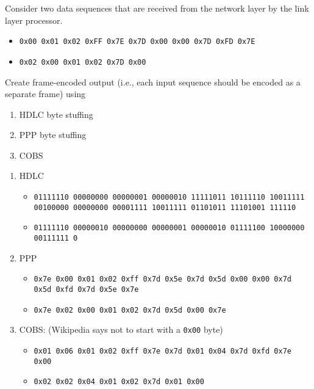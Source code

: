 \documentclass{report}
\begin{document}
\clearpage
\begin{problem}

Consider two data sequences that are received from the network layer by the link
layer processor.

\begin{itemize}
\item \texttt{0x00 0x01 0x02 0xFF 0x7E 0x7D 0x00 0x00 0x7D 0xFD 0x7E}
\item \texttt{0x02 0x00 0x01 0x02 0x7D 0x00}
\end{itemize}

Create frame-encoded output (i.e., each input sequence should be encoded as a
separate frame) using
\begin{enumerate}
\item HDLC byte stuffing
\item PPP byte stuffing
\item COBS
\end{enumerate}


\begin{answer}{45em}
  \begin{enumerate}
    \item HDLC
      \begin{itemize}
        \item \texttt{01111110 00000000 00000001 00000010 11111011 10111110 10011111 00100000 00000000 00001111 10011111 01101011 11101001 111110}
        \item \texttt{01111110 00000010 00000000 00000001 00000010 01111100 10000000 00111111 0}

      \end{itemize}

    \item PPP
      \begin{itemize}
        \item \texttt{0x7e 0x00 0x01 0x02 0xff 0x7d 0x5e 0x7d 0x5d 0x00 0x00 0x7d 0x5d 0xfd 0x7d 0x5e 0x7e}
        \item \texttt{0x7e 0x02 0x00 0x01 0x02 0x7d 0x5d 0x00 0x7e}
      \end{itemize}

    \item COBS: (Wikipedia says not to start with a \texttt{0x00} byte)
      \begin{itemize}
        \item \texttt{0x01 0x06 0x01 0x02 0xff 0x7e 0x7d 0x01 0x04 0x7d 0xfd 0x7e 0x00}
        \item \texttt{0x02 0x02 0x04 0x01 0x02 0x7d 0x01 0x00}
      \end{itemize}
  \end{enumerate}
\end{answer}
\end{problem}
\end{document}
